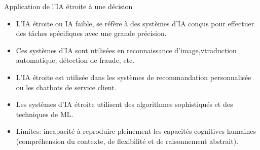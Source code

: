 \documentclass{beamer}
\begin{document}
\begin{frame}{Application de l'IA étroite à une décision}
	\begin{itemize}
		\item L'IA étroite ou IA faible, se réfère à des systèmes d'IA conçus pour effectuer des tâches spécifiques avec une grande précision.
		\item Ces systèmes d'IA sont utilisées en reconnaissance d'image,vtraduction automatique, détection de fraude, etc.
		\item L'IA étroite est utilisée dans les systèmes de recommandation personnalisée ou les chatbots de service client.
		\item Les systèmes d'IA étroite utilisent des algorithmes sophistiqués et des techniques de ML.
		\item Limites: incapacité à reproduire pleinement les capacités cognitives humaines (compréhension du contexte, de flexibilité et de raisonnement abstrait).
	\end{itemize}
\end{frame}
\end{document}
